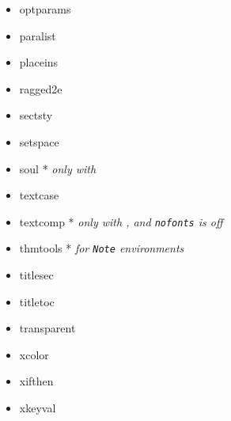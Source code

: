 \documentclass[a4paper]{tufte-book}
\begin{document}
\begin{multicols}{2}
\begin{itemize}
    \item optparams
    \item paralist
    \item placeins
    \item ragged2e
    \item sectsty
    \item setspace
    \item soul * \textit{only with }
    \item textcase
    \item textcomp * \textit{only with , and \texttt{nofonts} is off}
    \item thmtools * \textit{for \texttt{Note} environments}
    \item titlesec
    \item titletoc
    \item transparent
    \item xcolor
    \item xifthen
    \item xkeyval
  \end{itemize}
\end{multicols}


\backmatter{}

\printbibliography{}

\printindex{}
\end{document}
